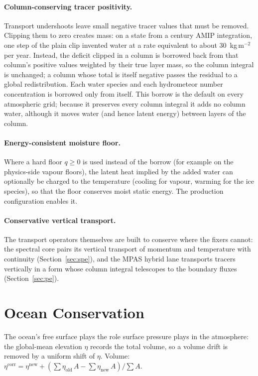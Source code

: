 \documentclass[11pt,twoside]{report}
\begin{document}
\paragraph{Column-conserving tracer positivity.}
Transport undershoots leave small negative tracer values that must be
removed.  Clipping them to zero creates mass: on a state from a century AMIP
integration, one step of the plain clip invented water at a rate equivalent to
about 30~kg\,m$^{-2}$ per year.  Instead, the
deficit clipped in a column is borrowed back from that column's positive values
weighted by their true layer mass, so the column integral is unchanged; a
column whose total is itself negative passes the residual to a global
redistribution.  Each water species and each hydrometeor number concentration
is borrowed only from itself.  This borrow is the default on every
atmospheric grid; because it preserves every column integral it adds no column
water, although it moves water (and hence latent energy) between layers of the
column.

\paragraph{Energy-consistent moisture floor.}
Where a hard floor $q\ge0$ is used instead of the borrow (for example on the
physics-side vapour floors), the latent heat implied by the added water can
optionally be charged to the temperature (cooling for vapour, warming for the
ice species), so that the floor conserves moist static energy.  The
production configuration enables it.

\paragraph{Conservative vertical transport.}
The transport operators themselves are built to conserve where the fixers
cannot: the spectral core pairs its vertical transport of momentum and
temperature with continuity (Section~\ref{sec:spe}), and the MPAS hybrid lane
transports tracers vertically in a form whose column integral telescopes to
the boundary fluxes (Section~\ref{sec:pe}).

\section{Ocean Conservation}

The ocean's free surface plays the role surface pressure plays in the
atmosphere: the global-mean elevation $\eta$ records the total volume, so a
volume drift is removed by a uniform shift of $\eta$.
Volume: $\eta^{\mathrm{corr}}=\eta^{\mathrm{new}}
+(\sum\eta_{\mathrm{old}}\,A-\sum\eta_{\mathrm{new}}\,A)/\sum A$.
\end{document}
